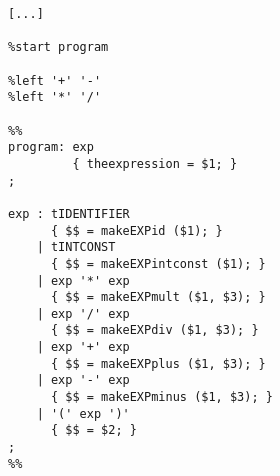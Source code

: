 \begin{slide*}
\begin{scriptsize}
\begin{verbatim}
[...]

%start program

%left '+' '-'
%left '*' '/'

%% 
program: exp
         { theexpression = $1; }
;

exp : tIDENTIFIER
      { $$ = makeEXPid ($1); }
    | tINTCONST
      { $$ = makeEXPintconst ($1); }
    | exp '*' exp
      { $$ = makeEXPmult ($1, $3); }
    | exp '/' exp
      { $$ = makeEXPdiv ($1, $3); }
    | exp '+' exp
      { $$ = makeEXPplus ($1, $3); }
    | exp '-' exp
      { $$ = makeEXPminus ($1, $3); }
    | '(' exp ')'
      { $$ = $2; }
;
%%
\end{verbatim}
\end{scriptsize}
\vfil
\end{slide*}

